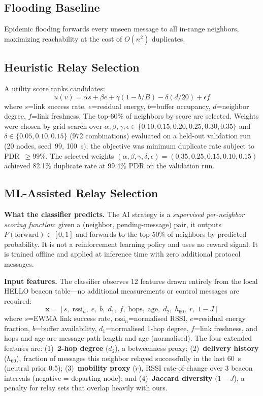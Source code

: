 \documentclass[conference]{IEEEtran}
\begin{document}
\subsection{Flooding Baseline}
Epidemic flooding forwards every unseen message to all in-range neighbors,
maximizing reachability at the cost of $O(n^2)$ duplicates.

\subsection{Heuristic Relay Selection}
A utility score ranks candidates:
\begin{equation}\label{eq:heuristic}
  u(v)=\alpha s+\beta e+\gamma(1-b/B)-\delta(d/20)+\epsilon f
\end{equation}
where $s$=link success rate, $e$=residual energy, $b$=buffer occupancy,
$d$=neighbor degree, $f$=link freshness.  The top-60\% of neighbors by score
are selected.  Weights were chosen by grid search over
$\alpha,\beta,\gamma,\epsilon\in\{0.10,0.15,0.20,0.25,0.30,0.35\}$ and
$\delta\in\{0.05,0.10,0.15\}$ (972 combinations) evaluated on a held-out
validation run (20 nodes, seed~99, 100~s); the objective was minimum duplicate
rate subject to PDR~$\geq99\%$.  The selected weights
$(\alpha,\beta,\gamma,\delta,\epsilon)=(0.35,0.25,0.15,0.10,0.15)$ achieved
82.1\% duplicate rate at 99.4\% PDR on the validation run.

\subsection{ML-Assisted Relay Selection}
\label{ssec:ml}

\textbf{What the classifier predicts.}
The AI strategy is a \emph{supervised per-neighbor scoring function}: given a
(neighbor, pending-message) pair, it outputs $P(\text{forward}) \in [0,1]$
and forwards to the top-50\% of neighbors by predicted probability.  It is not
a reinforcement learning policy and uses no reward signal.  It is trained
offline and applied at inference time with zero additional protocol messages.

\textbf{Input features.}
The classifier observes 12 features drawn entirely from the local HELLO beacon
table---no additional measurements or control messages are required:
\begin{equation}\label{eq:ai_features}
\mathbf{x} = [s,\;\text{rssi}_n,\;e,\;b,\;d_1,\;f,\;\text{hops},\;\text{age},\;d_2,\;h_{60},\;\dot{r},\;1{-}J]
\end{equation}
where $s$=EWMA link success rate, $\text{rssi}_n$=normalised RSSI, $e$=residual
energy fraction, $b$=buffer availability, $d_1$=normalised 1-hop degree, $f$=link
freshness, and hops and age are message path length and age (normalised).  The
four extended features are: (1)~\textbf{2-hop degree} ($d_2$), a betweenness
proxy; (2)~\textbf{delivery history} ($h_{60}$), fraction of messages this
neighbor relayed successfully in the last 60~s (neutral prior 0.5);
(3)~\textbf{mobility proxy} ($\dot{r}$), RSSI rate-of-change over 3 beacon
intervals (negative = departing node); and (4)~\textbf{Jaccard diversity}
($1-J$), a penalty for relay sets that overlap heavily with ours.
\end{document}
